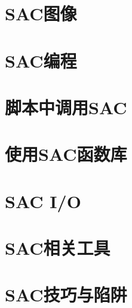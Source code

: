 \chapter{SAC图像}
\label{chap:sac-graphics}









\chapter{SAC编程}
\label{chap:sac-programming}






\chapter{脚本中调用SAC}
\label{chap:sac-script}





\chapter{使用SAC函数库}
\label{chap:sac-libs}





\chapter{SAC I/O}
\label{chap:sac-io}






\chapter{SAC相关工具}







\chapter{SAC技巧与陷阱}










